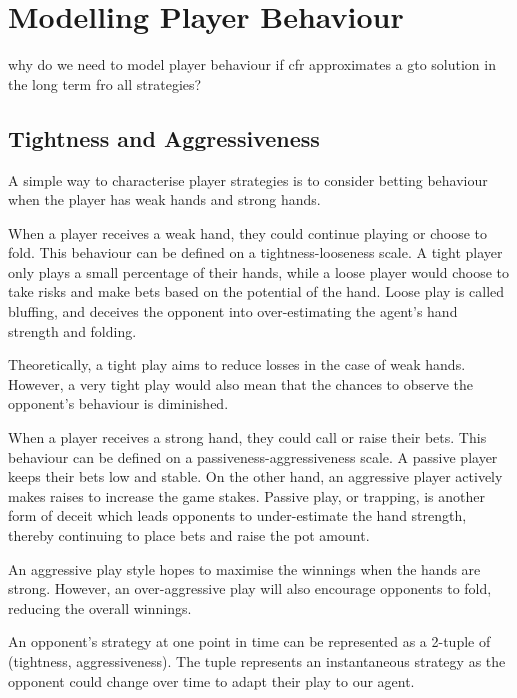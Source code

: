 \documentclass{article}
\begin{document}

\section{Modelling Player Behaviour}
why do we need to model player behaviour if cfr approximates a gto solution in the long term fro all strategies? 

\subsection{Tightness and Aggressiveness}
A simple way to characterise player strategies is to consider betting behaviour when the player has weak hands and strong hands. 

When a player receives a weak hand, they could continue playing or choose to fold. This behaviour can be defined on a tightness-looseness scale. A tight player only plays a small percentage of their hands, while a loose player would choose to take risks and make bets based on the potential of the hand. Loose play is called bluffing, and deceives the opponent into over-estimating the agent's hand strength and folding.

Theoretically, a tight play aims to reduce losses in the case of weak hands. However, a very tight play would also mean that the chances to observe the opponent's behaviour is diminished.

When a player receives a strong hand, they could call or raise their bets. This behaviour can be defined on a passiveness-aggressiveness scale. A passive player keeps their bets low and stable. On the other hand, an aggressive player actively makes raises to increase the game stakes. Passive play, or trapping, is another form of deceit which leads opponents to under-estimate the hand strength, thereby continuing to place bets and raise the pot amount.

An aggressive play style hopes to maximise the winnings when the hands are strong. However, an over-aggressive play will also encourage opponents to fold, reducing the overall winnings.

An opponent's strategy at one point in time can be represented as a 2-tuple of (tightness, aggressiveness). The tuple represents an instantaneous strategy as the opponent could change over time to adapt their play to our agent.
\end{document}
